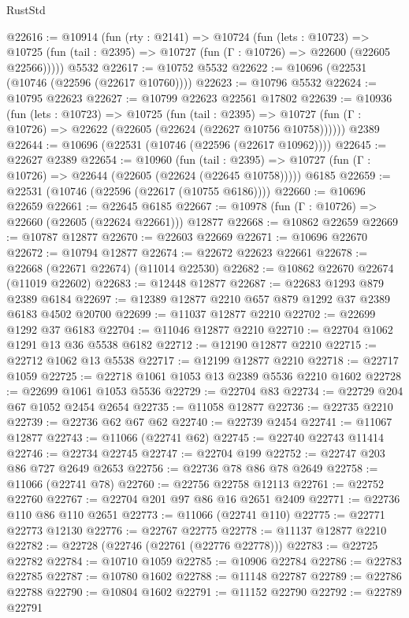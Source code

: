 \begin{lexlean}{RustStd}
\begin{coremodule}
@22616 := @10914
    (fun (rty : @2141) =>
    @10724
      (fun (lets : @10723) =>
      @10725 (fun (tail : @2395) => @10727 (fun (Γ : @10726) => @22600 (@22605 @22566)))))
    @5532
@22617 := @10752 @5532
@22622 := @10696 (@22531 (@10746 (@22596 (@22617 @10760))))
@22623 := @10796 @5532
@22624 := @10795 @22623
@22627 := @10799 @22623 @22561 @17802
@22639 := @10936
    (fun (lets : @10723) =>
    @10725
      (fun (tail : @2395) =>
      @10727 (fun (Γ : @10726) => @22622 (@22605 (@22624 (@22627 @10756 @10758))))))
    @2389
@22644 := @10696 (@22531 (@10746 (@22596 (@22617 @10962))))
@22645 := @22627 @2389
@22654 := @10960
    (fun (tail : @2395) => @10727 (fun (Γ : @10726) => @22644 (@22605 (@22624 (@22645 @10758)))))
    @6185
@22659 := @22531 (@10746 (@22596 (@22617 (@10755 @6186))))
@22660 := @10696 @22659
@22661 := @22645 @6185
@22667 := @10978 (fun (Γ : @10726) => @22660 (@22605 (@22624 @22661))) @12877
@22668 := @10862 @22659
@22669 := @10787 @12877
@22670 := @22603 @22669
@22671 := @10696 @22670
@22672 := @10794 @12877
@22674 := @22672 @22623 @22661
@22678 := @22668 (@22671 @22674) (@11014 @22530)
@22682 := @10862 @22670 @22674 (@11019 @22602)
@22683 := @12448 @12877
@22687 := @22683 @1293 @879 @2389 @6184
@22697 := @12389 @12877 @2210 @657 @879 @1292 @37 @2389 @6183 @4502 @20700
@22699 := @11037 @12877 @2210
@22702 := @22699 @1292 @37 @6183
@22704 := @11046 @12877 @2210
@22710 := @22704 @1062 @1291 @13 @36 @5538 @6182
@22712 := @12190 @12877 @2210
@22715 := @22712 @1062 @13 @5538
@22717 := @12199 @12877 @2210
@22718 := @22717 @1059
@22725 := @22718 @1061 @1053 @13 @2389 @5536 @2210 @1602
@22728 := @22699 @1061 @1053 @5536
@22729 := @22704 @83
@22734 := @22729 @204 @67 @1052 @2454 @2654
@22735 := @11058 @12877
@22736 := @22735 @2210
@22739 := @22736 @62 @67 @62
@22740 := @22739 @2454
@22741 := @11067 @12877
@22743 := @11066 (@22741 @62)
@22745 := @22740 @22743 @11414
@22746 := @22734 @22745
@22747 := @22704 @199
@22752 := @22747 @203 @86 @727 @2649 @2653
@22756 := @22736 @78 @86 @78 @2649
@22758 := @11066 (@22741 @78)
@22760 := @22756 @22758 @12113
@22761 := @22752 @22760
@22767 := @22704 @201 @97 @86 @16 @2651 @2409
@22771 := @22736 @110 @86 @110 @2651
@22773 := @11066 (@22741 @110)
@22775 := @22771 @22773 @12130
@22776 := @22767 @22775
@22778 := @11137 @12877 @2210
@22782 := @22728 (@22746 (@22761 (@22776 @22778)))
@22783 := @22725 @22782
@22784 := @10710 @1059
@22785 := @10906 @22784
@22786 := @22783 @22785
@22787 := @10780 @1602
@22788 := @11148 @22787
@22789 := @22786 @22788
@22790 := @10804 @1602
@22791 := @11152 @22790
@22792 := @22789 @22791

\end{coremodule}
\end{lexlean}
